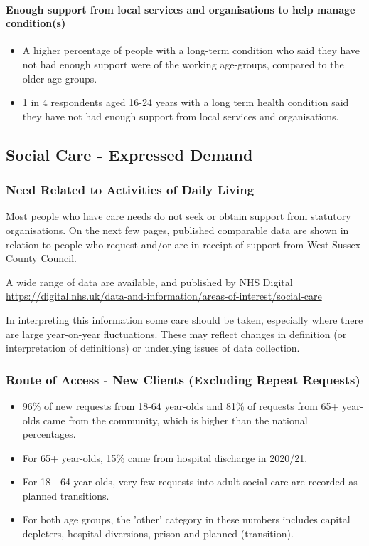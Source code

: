 \paragraph{Enough support from local services and organisations to help manage condition(s)} 
\begin{itemize}
    \item A higher percentage of people with a long-term condition who said they have not had enough support were of the working age-groups, compared to the older age-groups.
    \item 1 in 4 respondents aged 16-24 years with a long term health condition said they have not had enough support from local services and organisations.
\end{itemize}

\subsection{Social Care - Expressed Demand}
\subsubsection{Need Related to Activities of Daily Living}
Most people who have care needs do not seek or obtain support from statutory organisations. On the next few pages, published comparable data are shown in relation to people who request and/or are in receipt of support from West Sussex County Council.

A wide range of data are available, and published by NHS Digital \url{https://digital.nhs.uk/data-and-information/areas-of-interest/social-care}

In interpreting this information some care should be taken, especially where there are large year-on-year fluctuations. These may reflect changes in definition (or interpretation of definitions) or underlying issues of data collection.

\subsubsection{Route of Access - New Clients (Excluding Repeat Requests)}
\begin{itemize}[noitemsep]
    \item 96\% of new requests from 18-64 year-olds and 81\% of requests from 65+ year-olds came from the community, which is higher than the national percentages.
    \item For 65+ year-olds, 15\% came from hospital discharge in 2020/21.
    \item For 18 - 64 year-olds, very few requests into adult social care are recorded as planned transitions.
    \item For both age groups, the 'other' category in these numbers includes capital depleters, hospital diversions, prison and planned (transition). 
\end{itemize}

